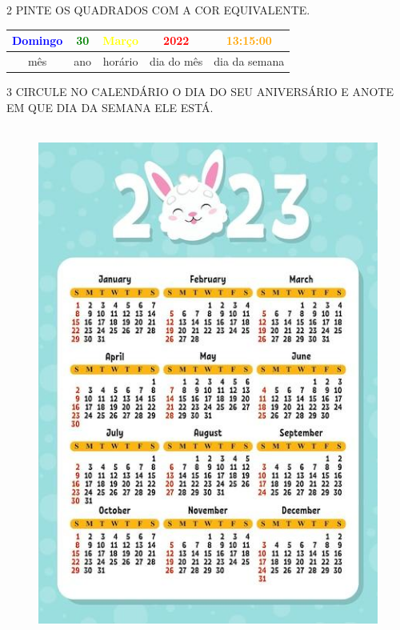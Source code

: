 \num{2} PINTE OS QUADRADOS COM A COR EQUIVALENTE.

\begin{center}
{\large
\begin{tabular}{|c|c|c|c|c|}
\hline
\textcolor{blue}{\textbf{Domingo}} & \textcolor{green}{\textbf{30}} & \textcolor{yellow}{\textbf{Março}} & \textcolor{red}{\textbf{2022}} & \textcolor{orange}{\textbf{13:15:00}} \\ \hline
mês & ano & horário & dia do mês & dia da semana \\ \hline
\end{tabular}
}
\end{center}


\pagebreak
\num{3} CIRCULE NO CALENDÁRIO O DIA DO SEU ANIVERSÁRIO E ANOTE EM QUE DIA DA SEMANA ELE ESTÁ.


\begin{figure}[htpb!]
\centering
\includegraphics[width=4.71050in,height=6.67143in]{media/image35.jpg}
\end{figure}


